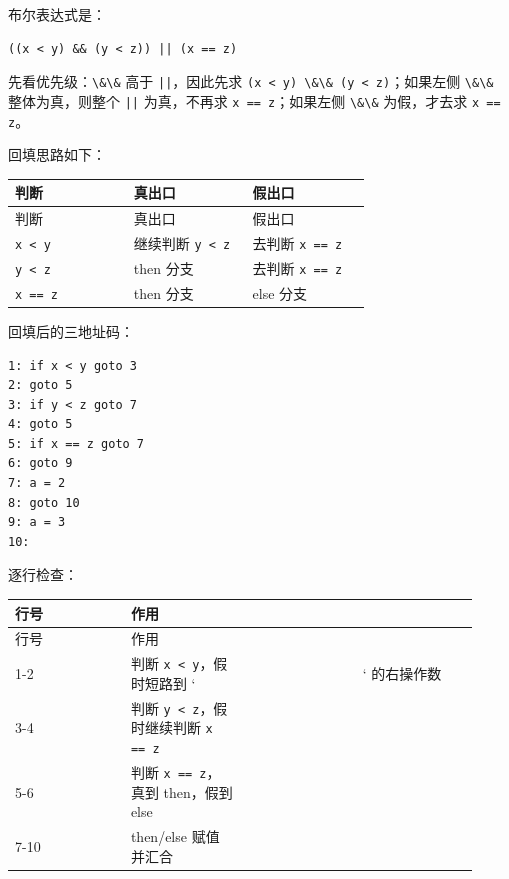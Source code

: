\documentclass[UTF8]{ctexart}
\begin{document}
布尔表达式是：

\begin{Verbatim}[fontsize=\small,breaklines=true]
((x < y) && (y < z)) || (x == z)
\end{Verbatim}

先看优先级：\texttt{\textbackslash{}\&\textbackslash{}\&} 高于 \texttt{||}，因此先求 \texttt{(x < y) \textbackslash{}\&\textbackslash{}\& (y < z)}；如果左侧 \texttt{\textbackslash{}\&\textbackslash{}\&} 整体为真，则整个 \texttt{||} 为真，不再求 \texttt{x == z}；如果左侧 \texttt{\textbackslash{}\&\textbackslash{}\&} 为假，才去求 \texttt{x == z}。

回填思路如下：

\begin{longtable}{|p{0.31\linewidth}|p{0.31\linewidth}|p{0.31\linewidth}|}
\hline
判断 & 真出口 & 假出口 \\
\hline
\endfirsthead
判断 & 真出口 & 假出口 \\
\hline
\endhead
\texttt{x < y} & 继续判断 \texttt{y < z} & 去判断 \texttt{x == z} \\
\hline
\texttt{y < z} & then 分支 & 去判断 \texttt{x == z} \\
\hline
\texttt{x == z} & then 分支 & else 分支 \\
\hline
\end{longtable}

回填后的三地址码：

\begin{Verbatim}[fontsize=\small,breaklines=true]
1: if x < y goto 3
2: goto 5
3: if y < z goto 7
4: goto 5
5: if x == z goto 7
6: goto 9
7: a = 2
8: goto 10
9: a = 3
10:
\end{Verbatim}

逐行检查：

\begin{longtable}{|p{0.23\linewidth}|p{0.23\linewidth}|p{0.23\linewidth}|p{0.23\linewidth}|}
\hline
行号 & 作用 &  &  \\
\hline
\endfirsthead
行号 & 作用 &  &  \\
\hline
\endhead
1-2 & 判断 \texttt{x < y}，假时短路到 ` &  & ` 的右操作数 \\
\hline
3-4 & 判断 \texttt{y < z}，假时继续判断 \texttt{x == z} &  &  \\
\hline
5-6 & 判断 \texttt{x == z}，真到 then，假到 else &  &  \\
\hline
7-10 & then/else 赋值并汇合 &  &  \\
\hline
\end{longtable}
\end{document}
